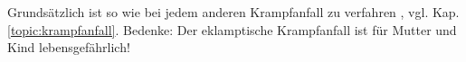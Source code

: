 \label{m:eklampsie}
Grundsätzlich ist so wie bei jedem anderen Krampfanfall zu verfahren , vgl. Kap. \ref{topic:krampfanfall}. Bedenke:
Der eklamptische Krampfanfall ist für Mutter und Kind lebensgefährlich!